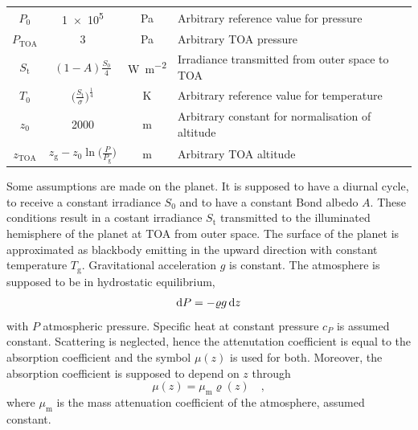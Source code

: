 \documentclass[a4paper,10pt,twocolumn,\classoptions]{article}
\newcommand{\zTOA}{z_\text{TOA}}
\newcommand{\PTOA}{P_\text{TOA}}
\begin{document}
\begin{table}[h]
\begin{tabular}[b]{cccp{}}
    $P_0$             & \num{1e5}                                                              & \unit{\pascal}                                    & Arbitrary reference value for pressure                                                    \\
    $\PTOA$           & \num{3}                                                                & \unit{\pascal}                                    & Arbitrary TOA pressure                                                                    \\
    $S_\text{t}$      & $(1 - A) \frac{S_0}{4}$                                                & \unit{\watt\per\square\metre}                     & Irradiance transmitted from outer space to TOA                                            \\
    $T_0$             & $\big( \frac{S_\text{t}}{\sigma} \big)^\frac{1}{4}$                    & \unit{\kelvin}                                    & Arbitrary reference value for temperature                                                 \\
    $z_0$             & \num{2000}                                                             & \unit{\metre}                                     & Arbitrary constant for normalisation of altitude                                          \\
    $\zTOA$           & $z_\text{g} - z_0 \ln{\Big( \frac{P}{P_\text{g}} \Big)}$               & \unit{\metre}                                     & Arbitrary TOA altitude                                                                    \\
    \bottomrule
  \end{tabular}
\end{table}

Some assumptions are made on the planet.
It is supposed to have a diurnal cycle, to receive a constant irradiance $S_0$ and to have a constant Bond albedo $A$. These conditions result in a costant irradiance $S_\text{t}$ transmitted to the illuminated hemisphere of the planet at TOA from outer space.
The surface of the planet is approximated as blackbody emitting in the upward direction with constant temperature $T_\text{g}$.
Gravitational acceleration $g$ is constant.
The atmosphere is supposed to be in hydrostatic equilibrium,
\begin{equation}
  \label{eq:hydrostatic_equilibrium}
  \odif{P} = - \varrho g \odif{z}
\end{equation}
with $P$ atmospheric pressure.
Specific heat at constant pressure $c_P$ is assumed constant.
Scattering is neglected, hence the attenutation coefficient is equal to the absorption coefficient and the symbol $\mu(z)$ is used for both.
Moreover, the absorption coefficient is supposed to depend on $z$ through
\begin{equation}
  \label{eq:absorption coefficient}
  \mu(z) = \mu_\text{m} \varrho(z)
  \quad ,
\end{equation}
where $\mu_\text{m}$ is the mass attenuation coefficient of the atmosphere, assumed constant.
\end{document}
